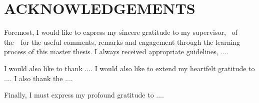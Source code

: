 
\chapter*{ACKNOWLEDGEMENTS}

Foremost, I would like to express my sincere gratitude to my supervisor, \thesupervisor\ of the~\thesupervisorUni\ for the useful comments, remarks and engagement through the learning process of this master thesis. 
I always received appropriate guidelines, ....


I would also like to thank ....
%
I would also like to extend my heartfelt gratitude to  ....
%
I also thank the ....


Finally, I must express my profound gratitude to ....


%
%
%


 






\vfill

